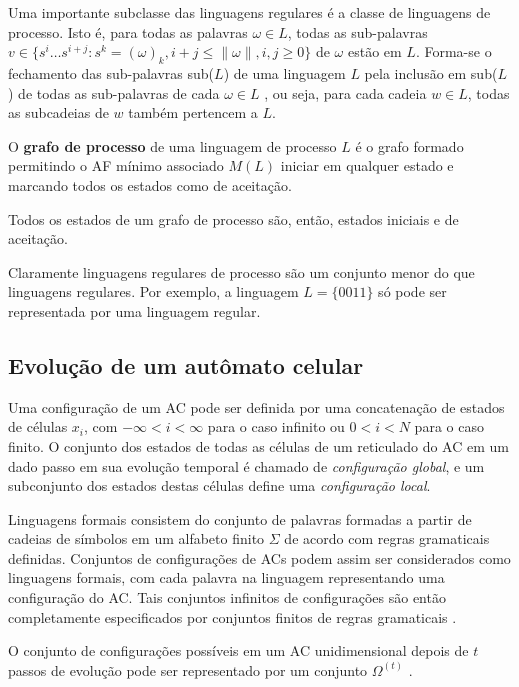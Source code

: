 \documentclass[12pt,a4paper]{article}
\newenvironment{definition}[1][Definição]{\begin{trivlist}
\item[\hskip \labelsep {\bfseries #1}]}{\end{trivlist}}
\begin{document}
Uma importante subclasse das linguagens regulares é a classe de linguagens
de processo. Isto é, para todas as palavras $\omega \in L$, todas as
sub-palavras
$v \in \{s^i \ldots s^{i+j}:s^k=(\omega)_k,i+j\le \|\omega\|,i,j\ge 0\}$
de $\omega$ estão em $L$. Forma-se o fechamento das sub-palavras sub($L$)
de uma linguagem $L$ pela inclusão em sub($L$) de todas as sub-palavras
de cada $\omega \in L$ , ou seja, para cada
cadeia $w \in L$, todas as subcadeias de $w$ também pertencem a $L$.

\begin{definition}
O \textbf{grafo de processo} de uma linguagem de processo $L$ é o grafo
formado permitindo o AF mínimo associado $M(L)$ iniciar em qualquer
estado e marcando todos os estados como de aceitação.
\end{definition}

Todos os estados de um grafo de processo são, então, estados iniciais e de
aceitação.

Claramente linguagens regulares de processo são um conjunto menor do que
linguagens regulares. Por exemplo, a linguagem $L = \{0011\}$ só pode ser
representada por uma linguagem regular.

\subsection{Evolução de um autômato celular}

Uma configuração de um AC pode ser definida por uma concatenação de estados
de células $x_i$, com $-\infty < i < \infty$ para o caso infinito ou
$0 < i < N$ para o caso finito. O conjunto dos estados de todas as células
de um reticulado do AC em um dado passo em sua evolução temporal é chamado de
\textit{configuração global}, e um subconjunto dos estados destas
células define uma \textit{configuração local}.

Linguagens formais consistem do conjunto de palavras formadas a partir de
cadeias de símbolos em um alfabeto finito $\Sigma$ de acordo com regras
gramaticais definidas. Conjuntos de configurações de ACs
podem assim ser considerados como linguagens formais, com cada palavra na
linguagem representando uma configuração do AC. Tais conjuntos
infinitos de configurações são então completamente especificados por
conjuntos finitos de regras gramaticais .

O conjunto de configurações possíveis em um AC unidimensional depois de $t$
passos de evolução pode ser representado por um conjunto $\Omega^{(t)}$
.
\end{document}
